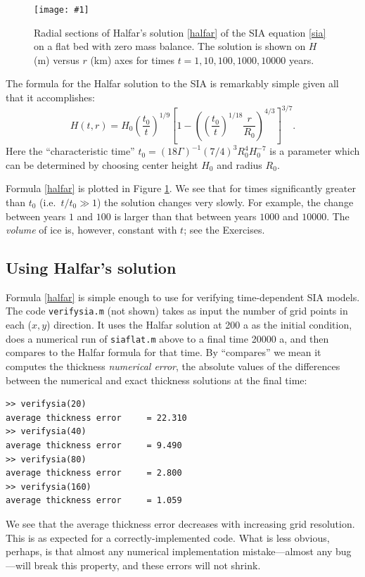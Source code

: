 \documentclass[letterpaper,final,12pt,reqno]{amsart}
\newcommand{\onefigsize}[3]{
\begin{figure}[ht]
\centering
\texttt{[image: \#1]}
\caption{#2}
\label{fig:#1}
\end{figure}}
\begin{document}
\onefigsize{siascaling}{Radial sections of Halfar's solution \eqref{halfar} of the SIA equation \eqref{sia} on a flat bed with zero mass balance.  The solution is shown on $H$ (m) versus $r$ (km) axes for times $t=1,10,100,1000,10000$ years.}{5.5in}

The formula for the Halfar solution to the SIA is remarkably simple given all that it accomplishes:
\begin{equation}
H(t,r) = H_0 \left(\frac{t_0}{t}\right)^{1/9} \left[1 - \left(\left(\frac{t_0}{t}\right)^{1/18} \frac{r}{R_0}\right)^{4/3}\right]^{3/7}. \label{halfar}
\end{equation}
Here the ``characteristic time'' $t_0 = (18 \Gamma)^{-1} (7/4)^3 R_0^4 H_0^{-7}$ is a parameter which can be determined by choosing center height $H_0$ and radius $R_0$.

Formula \eqref{halfar} is plotted in Figure \ref{fig:siascaling}.  We see that for times significantly greater than $t_0$ (i.e.~$t/t_0 \gg 1$) the solution changes very slowly.  For example, the change between years $1$ and $100$ is larger than that between years $1000$ and $10000$.  The \emph{volume} of ice is, however, constant with $t$; see the Exercises.

\subsection*{Using Halfar's solution}  Formula \eqref{halfar} is simple enough to use for verifying time-dependent SIA models.  The code \texttt{verifysia.m} (not shown) takes as input the number of grid points in each ($x,y$) direction.  It uses the Halfar solution at 200 a as the initial condition, does a numerical run of \texttt{siaflat.m} above to a final time 20000 a, and then compares to the Halfar formula for that time.  By ``compares'' we mean it computes the thickness \emph{numerical error}, the absolute values of the differences between the numerical and exact thickness solutions at the final time:
\small
\begin{verbatim}
>> verifysia(20)
average thickness error     = 22.310
>> verifysia(40)
average thickness error     = 9.490
>> verifysia(80)
average thickness error     = 2.800
>> verifysia(160)
average thickness error     = 1.059
\end{verbatim}
\normalsize
We see that the average thickness error decreases with increasing grid resolution.  This is as expected for a correctly-implemented code.  What is less obvious, perhaps, is that almost any numerical implementation mistake---almost any bug---will break this property, and these errors will not shrink.
\end{document}
